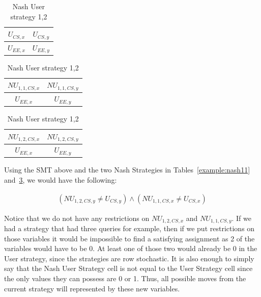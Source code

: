 \documentclass{article}
\begin{document}
\begin{table}[h!]
    \centering
    \begin{minipage}{.2\linewidth}
        \caption{User strategy}
        \centering
        \begin{tabular}{|c|c|}
            \hline
            $U_{CS,x}$ & $U_{CS,y}$\\
            \hline
            $U_{EE,x}$ & $U_{EE,y}$\\
            \hline
        \end{tabular}
        \label{example:regular}
    \end{minipage}
    \begin{minipage}{.3\linewidth}
        \caption{Nash User strategy 1,1}
        \centering
        \begin{tabular}{|c|c|}
            \hline
            $NU_{1,1,CS,x}$ & $NU_{1,1,CS,y}$\\
            \hline
            $U_{EE,x}$ & $U_{EE,y}$\\
            \hline
        \end{tabular}
        \label{example:nash11}
    \end{minipage}
    \begin{minipage}{.3\linewidth}
        \caption{Nash User strategy 1,2}
        \centering
        \begin{tabular}{|c|c|}
            \hline
            $NU_{1,2,CS,x}$ & $NU_{1,2,CS,y}$\\
            \hline
            $U_{EE,x}$ & $U_{EE,y}$\\
            \hline
        \end{tabular}
        \label{example:nash12}
    \end{minipage}
\end{table}

Using the SMT above and the two Nash Strategies in Tables~\ref{example:nash11} and~\ref{example:nash12}, we would have the following:

\begin{align}
\label{eqn:nashexample}
(NU_{1,2,CS,y} \ne U_{CS,y}) \land (NU_{1,1,CS,x} \ne U_{CS,x})
\end{align}

Notice that we do not have any restrictions on $NU_{1,2,CS,x}$ and $NU_{1,1,CS,y}$. If we had a strategy that had three queries for example, then if we put restrictions on those variables it would be impossible to find a satisfying assignment as 2 of the variables would have to be 0. At least one of those two would already be 0 in the User strategy, since the strategies are row stochastic. It is also enough to simply say that the Nash User Strategy cell is not equal to the User Strategy cell since the only values they can possess are 0 or 1. Thus, all possible moves from the current strategy will represented by these new variables. 
\end{document}
